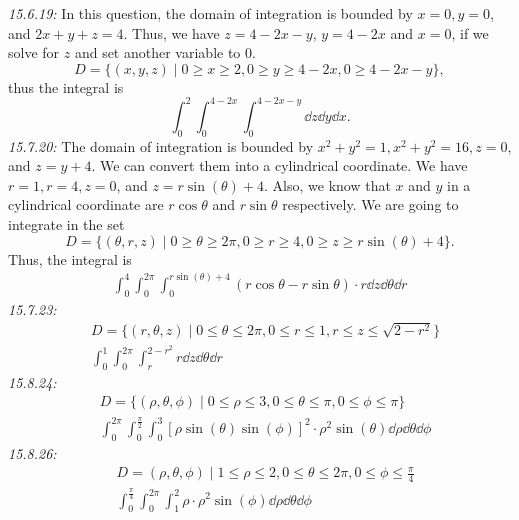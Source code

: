 \documentclass[8pt,twocolumn]{article}
\begin{document}
\begin{Answer}[number=19]
  \emph{15.6.19:}
  In this question, the domain of integration is bounded by $x=0, y=0$, and
  $2x+y+z=4$. Thus, we have $z=4-2x-y$, $y=4-2x$ and $x=0$, if we solve for $z$
  and set another variable to $0$.
  \[D = \{(x,y,z) \mid 0\ge x\ge 2, 0\ge y\ge 4-2x, 0\ge 4-2x-y\},\] thus the
  integral is
  \[\int_0^2\int_0^{4-2x}\int_0^{4-2x-y}\dd{z}\dd{y}\dd{x}.\]
  \emph{15.7.20:}
  The domain of integration is bounded by $x^2+y^2=1, x^2+y^2=16, z=0$, and
  $z=y+4$. We can convert them into a cylindrical coordinate. We have $r=1,
  r=4, z=0$, and $z=r\sin(\theta)+4$. Also, we know that $x$ and $y$ in a
  cylindrical coordinate are $r\cos\theta$ and $r\sin\theta$ respectively. We
  are going to integrate in the set
  \[
    D = \{(\theta, r, z) \mid 0\ge\theta\ge2\pi, 0\ge r\ge4, 0\ge z\ge
    r\sin(\theta)+4\}.
  \]
  Thus, the integral is
  \begin{align*}
    \int_0^4\int_0^{2\pi}\int_0^{r\sin(\theta)+4} (r\cos\theta-
    r\sin\theta)\cdot r\dd{z}\dd{\theta}\dd{r}
  \end{align*}
  \emph{15.7.23:}
  \begin{align*}
    &D = \{(r,\theta,z) \mid 0\le \theta\le2\pi, 0\le r\le 1, r\le z\le
    \sqrt{2-r^2}\} \\
    &\int_0^1\int_0^{2\pi}\int_r^{2-r^2} r\dd{z}\dd{\theta}\dd{r}
  \end{align*}
  \emph{15.8.24:}
  \begin{align*}
    &D = \{(\rho, \theta, \phi) \mid 0\le \rho \le 3, 0\le \theta\le \pi,
    0\le\phi\le \pi \} \\
    &\int_0^{2\pi}\int_0^{\frac{\pi}{2}}\int_0^3
    \left[\rho\sin(\theta)\sin(\phi)\right]^2\cdot\rho^2\sin(\theta) \dd{\rho}\dd{\theta}\dd{\phi}
  \end{align*}
  \emph{15.8.26:}
  \begin{align*}
    &D = {(\rho, \theta, \phi)\mid1\le\rho\le2, 0\le\theta\le2\pi,
    0\le\phi\le\frac{\pi}{4}} \\
    &\int_0^{\frac{\pi}{4}}\int_0^{2\pi}\int_1^2 \rho \cdot \rho^2\sin(\phi) \dd{\rho}\dd{\theta}\dd{\phi}
  \end{align*}
\end{Answer}
\end{document}
